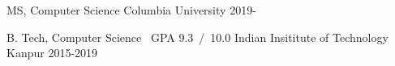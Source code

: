 

\cventry
	{MS, Computer Science}
	{Columbia University}
	{2019-}
	{}
	{}

\cventry
	{B. Tech, Computer Science \acvSectionTitleSep \ GPA 9.3{\tiny\ }/{\tiny\ }10.0}
	{Indian Insititute of Technology Kanpur}
	{2015-2019}
	{}
	{}

